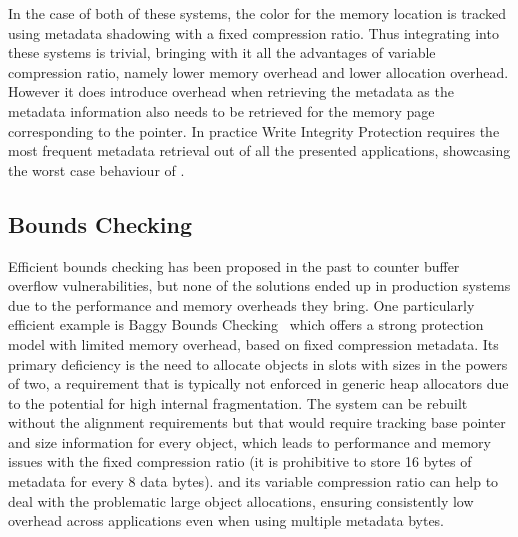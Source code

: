 In the case of both of these systems, the color for the memory location is tracked
using metadata shadowing with a fixed compression ratio. Thus integrating \projectname{}
into these systems is trivial, bringing with it all the advantages of variable compression ratio,
namely lower memory overhead and lower allocation overhead. However it does introduce
overhead when retrieving the metadata as the metadata information also needs to
be retrieved for the memory page corresponding to the pointer. In practice Write Integrity Protection
requires the most frequent metadata retrieval out of all the presented applications, showcasing the
worst case behaviour of \projectname{}.

\subsection{Bounds Checking}

Efficient bounds checking has been proposed in the past to counter
buffer overflow vulnerabilities, but none of the solutions ended up in production systems
due to the performance and memory overheads they bring. One particularly efficient example is
Baggy Bounds Checking~\cite{akritidis2009baggy} which offers a strong protection model with limited memory overhead,
based on fixed compression metadata. Its primary deficiency is the need to allocate objects in slots
with sizes in the powers of two, a requirement that is typically not enforced in generic heap allocators
due to the potential for high internal fragmentation.
The system can be rebuilt without the alignment requirements but that would require tracking
base pointer and size information for every object, which leads to performance and memory issues with
the fixed compression ratio (it is prohibitive to store 16 bytes of metadata for every 8 data bytes).
\projectname{} and its variable compression ratio can help to deal with the problematic large object allocations,
ensuring consistently low overhead across applications even when using multiple metadata bytes.

